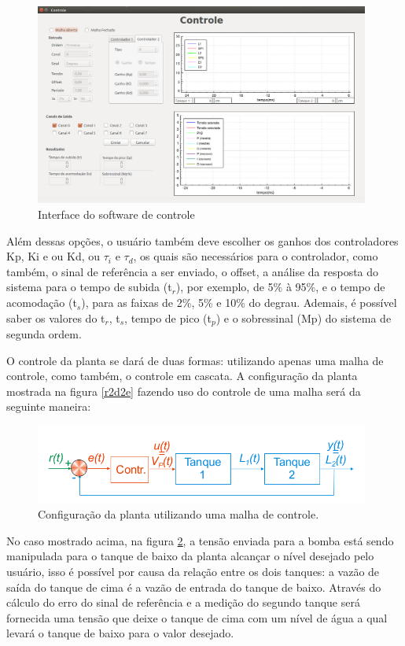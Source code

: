 \documentclass[a4paper,12pt]{article}
\begin{document}
\begin{flushleft}
\begin{figure}[H]
\centering
\includegraphics[width=11cm]{ImagensLab4/interface-versao4.png}
\caption{Interface do software de controle}
\label{interface}
\end{figure}

\hspace{4ex}Além dessas opções, o usuário também deve escolher os ganhos dos controladores Kp, Ki e ou Kd, ou $\tau_i$ e $\tau_d$, os quais são necessários para o controlador, como também, o  sinal de referência a ser enviado, o offset, a análise da resposta do sistema para o tempo de subida (t$_r$), por exemplo, de 5\% à 95\%, e o tempo de acomodação (t$_s$), para as faixas de 2\%, 5\% e 10\% do degrau. Ademais, é possível saber os valores do  t$_r$, t$_s$, tempo de pico (t$_p$) e o sobressinal (Mp) do sistema de segunda ordem.

\hspace{4ex}O controle da planta se dará de duas formas: utilizando apenas uma malha de controle, como também, o controle em cascata. A configuração da planta mostrada na figura \ref{r2d2e} fazendo uso do controle de uma malha será da seguinte maneira:

\begin{figure}[H]
\centering
\includegraphics[width=11cm]{ImagensLab4/umamalha.png}
\caption{Configuração da planta utilizando uma malha de controle.}
\label{umamalha}
\end{figure}

\hspace{4ex}No caso mostrado acima, na figura \ref{umamalha}, a tensão enviada para a bomba está sendo manipulada para o tanque de baixo da planta alcançar o nível desejado pelo usuário, isso é possível por causa da relação entre os dois tanques: a vazão de saída do tanque de cima é a vazão de entrada do tanque de baixo. Através do cálculo do erro do sinal de referência e a medição do segundo tanque será fornecida uma tensão que deixe o tanque de cima com um nível de água a qual levará o tanque de baixo para o valor desejado.


\end{flushleft}
\end{document}
